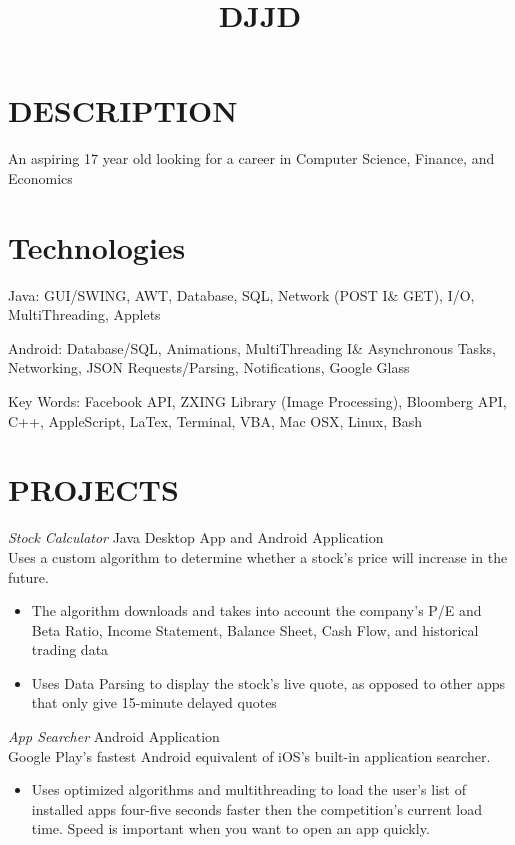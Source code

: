 \documentclass[line,margin]{res}
\begin{document}
\address{23 Silvers Lane, Cranbury, NJ, 08512. (609) 915 - 4930}
\address{dsouzarc@gmail.com, linkedin.com/in/dsouzarc \hspace{20ex}}
\begin{resume}
\title{DJJD}
 
\section{DESCRIPTION}An aspiring 17 year old looking for a career in Computer Science, Finance, and Economics

\section{Technologies}	Java: GUI/SWING, AWT, Database, SQL, Network (POST I\& GET), I/O, MultiThreading, Applets

Android: Database/SQL, Animations, MultiThreading I\& Asynchronous Tasks, Networking, JSON Requests/Parsing, Notifications, Google Glass

Key Words: Facebook API, ZXING Library (Image Processing), Bloomberg API, C++, AppleScript, LaTex, Terminal, VBA, Mac OSX, Linux, Bash

\section{PROJECTS} {\sl Stock Calculator} \hfill Java Desktop App and Android Application \\
                Uses a custom algorithm to determine whether a stock's price will increase in the future.
                 \begin{itemize}  \itemsep -2pt %
                 \item The algorithm downloads and takes into account the company's P/E and Beta Ratio, Income Statement, Balance Sheet, Cash Flow, and historical trading data
                \item Uses Data Parsing to display the stock's live quote, as opposed to other apps that only give 15-minute delayed quotes
                \end{itemize}
 
                {\sl App Searcher} \hfill            Android Application \\
                Google Play's fastest Android equivalent of iOS's built-in application searcher.
                 \begin{itemize}  \itemsep -2pt %
                 \item Uses optimized algorithms and multithreading to load the user's list of installed apps four-five seconds faster then the competition's current load time. Speed is important when you want to open an app quickly.
                 \end{itemize} 
                 

\end{resume}
\end{document}
